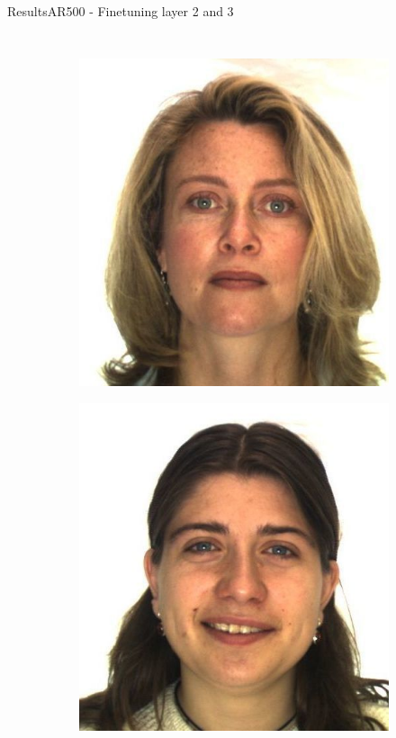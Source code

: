 \begin{frame}{Results}{AR500 - Finetuning layer 2 and 3}
\begin{columns}
\begin{figure}
\begin{subfigure}[b]{0.45\textwidth}
                \includegraphics[width=\textwidth]{sections/malte_slides/ar2}
            \end{subfigure}
            \begin{subfigure}[b]{0.45\textwidth}
                \includegraphics[width=\textwidth]{sections/malte_slides/ar3}
            \end{subfigure}
        \end{figure}
    \end{columns}
\end{frame}

